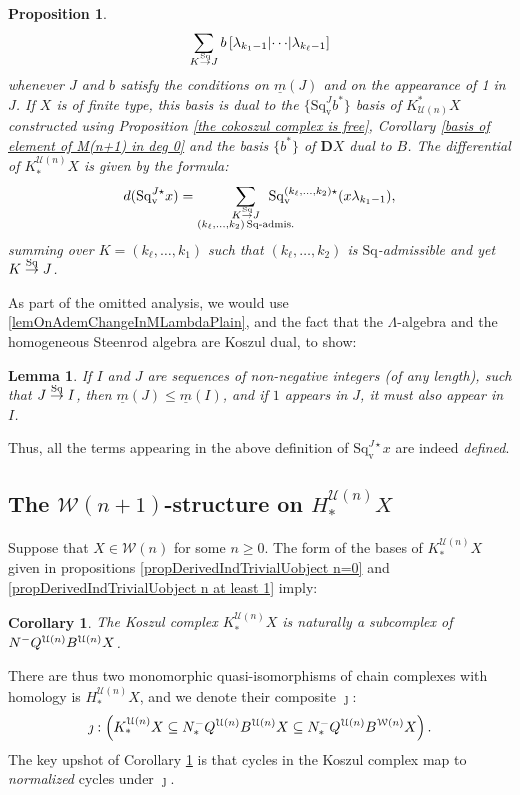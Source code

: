 \documentclass[11pt]{amsart} \renewcommand{\baselinestretch}{1.2}
\theoremstyle{plain}
\newtheorem{lem}[thm]{Lemma}
\newtheorem{prop}[thm]{Proposition}
\newtheorem{cor}[thm]{Corollary}
\numberwithin{equation}{section} %
\theoremstyle{plain}
\newtheorem{lem}[thm]{Lemma}
\newtheorem{prop}[thm]{Proposition}
\newtheorem{cor}[thm]{Corollary}
\numberwithin{equation}{chapter} %
\newcommand{\calU}{\mathcal{U}}
\newcommand{\calw}{\mathcal{W}}
\newcommand{\minDimSq}{\underline{m}}
\newcommand{\produces}[3]{#3:#1\sim #2}
\renewcommand{\produces}[3]{#1\rightarrow_{#3} #2}%
\renewcommand{\produces}[3]{#1\overset{\smash{#3}}{\rightarrow} #2}%
\newcommand{\Nop}{N^{\smash{-}}}
\newcommand{\Sq}{\mathrm{Sq}}
\newcommand{\dver}{_\mathrm{v}}
\newcommand{\Sqv}{\mathrm{Sq}\dver}
\newcommand{\Sqvstar}[1]{\mathrm{Sq}\dver^{#1\star}}
\newcommand{\dual}{\mathbf{D}}
\newcommand{\SubsectionOrSection}[1]{\subsection{#1}}
\begin{document}
\begin{Koszul complexes}
\begin{prop}
\[\sum_{\produces{K}{J}{\Sq}}b\left[\lambda_{k_1-1} \middle|\cdots\middle|\lambda_{k_\ell-1} \right]\]
whenever $J$ and $b$ satisfy the conditions on $\minDimSq(J)$ and on the appearance of 1 in $J$.
If $X$ is  of finite type, this basis is dual to the $\{\Sqv^Jb^*\}$ basis of $K^*_{\calU(n)}X$   constructed using Proposition \ref{the cokoszul complex is free}, Corollary \ref{basis of element of M(n+1) in deg 0} and the basis $\{b^*\}$  of $\dual X$ dual to $B$. The differential of $K^{\calU(n)}_*X$ is given by the formula:
\[d(\Sqvstar{J}x)=\sum_{ \substack{\produces{K}{J}{\Sq}\\(k_{\ell},\ldots,k_2){\,\Sq\textup{-admis.}}}}\!\!\!\!\!\!\!\!\!\!\!\! \Sqvstar{(k_{\ell},\ldots,k_2)}(x\lambda_{k_1-1}),\]
summing over $K=(k_{\ell},\ldots,k_1)$ such that $(k_{\ell},\ldots,k_2)$ is $\Sq$-admissible %
and yet $\produces{K}{J}{\Sq}$.
\end{prop}
\noindent As part of the omitted analysis, we would use \ref{lemOnAdemChangeInMLambdaPlain}, and the fact that the $\Lambda$-algebra and the homogeneous Steenrod algebra are Koszul dual, to show:
\begin{lem}
If $I$ and $J$ are sequences of non-negative integers (of any length), such that $\produces{J}{I}{\Sq}$, then $\minDimSq(J)\leq\minDimSq(I)$, and if $1$ appears in $J$, it must also appear in $I$.
\end{lem}
\noindent Thus, all the terms appearing in the above definition of $\Sqvstar{J}x$ are indeed \emph{defined}.
\SubsectionOrSection{The $\calw(n+1)$-structure on $H_*^{\calU(n)}X$}\label{section on structure on homology of koszul cx}
Suppose that $X\in\calw(n)$ for some $n\geq0$. The form of the bases of $K_*^{\calU(n)}X$ given in propositions \ref{propDerivedIndTrivialUobject n=0} and \ref{propDerivedIndTrivialUobject n at least 1} imply:
\begin{cor}
\label{cycles in the Koszul complex are normalized cycles}
The Koszul complex $K_*^{\calU(n)}X$ is naturally a subcomplex of $\Nop Q^{\calU(n)}B^{\calU(n)}X$.
\end{cor}
\noindent  There are  thus two monomorphic quasi-isomorphisms of chain complexes with homology is $H_*^{\calU(n)}X$, and we denote their composite $\jmath$:
\[\jmath:\left(K_*^{\calU(n)}X\subseteq \Nop_*Q^{\calU(n)}B^{\calU(n)}X\subseteq \Nop_*Q^{\calU(n)}B^{\calw(n)}X\right).\]
The key upshot of Corollary \ref{cycles in the Koszul complex are normalized cycles} is that cycles in the Koszul complex map to \emph{normalized} cycles under $\jmath$.


\end{Koszul complexes}
\end{document}
